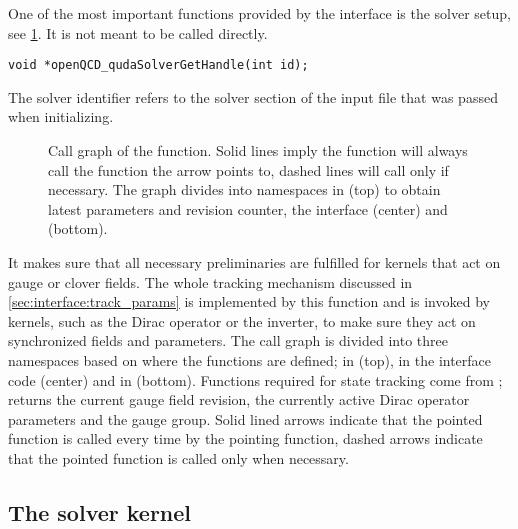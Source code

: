 One of the most important functions provided by the interface is the solver setup, see \cref{fig:call_graph}.
It is not meant to be called directly.
\begin{verbatim}
void *openQCD_qudaSolverGetHandle(int id);
\end{verbatim}
The solver identifier refers to the solver section of the input file that was passed when initializing.
\begin{figure}
  
  \caption{Call graph of the  function. Solid lines imply the function will always call the function the arrow points to, dashed lines will call only if necessary. The graph divides into namespaces in \openqxd (top) to obtain latest parameters and revision counter, the interface (center) and \quda (bottom).}
  \label{fig:call_graph}
\end{figure}
It makes sure that all necessary preliminaries are fulfilled for kernels that act on gauge or clover fields.
The whole tracking mechanism discussed in \cref{sec:interface:track_params} is implemented by this function and is invoked by kernels, such as the Dirac operator or the inverter, to make sure they act on synchronized fields and parameters.
The call graph is divided into three namespaces based on where the functions are defined; in \openqxd (top), in the interface code (center) and in \quda (bottom).
Functions required for state tracking come from \openqxd;  returns the current gauge field revision,  the currently active Dirac operator parameters and  the gauge group.
Solid lined arrows indicate that the pointed function is called every time by the pointing function, dashed arrows indicate that the pointed function is called only when necessary.

\subsection{The solver kernel}
\label{sec:interface:solver:simple}



